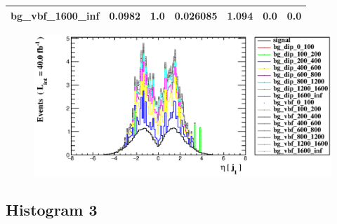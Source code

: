 \documentclass[a4paper, 10pt]{article}
\begin{document}
\begin{table}[H]
\begin{center}
\begin{tabular}{|m{23.0mm}|m{23.0mm}|m{18.0mm}|m{19.0mm}|m{19.0mm}|m{19.0mm}|m{19.0mm}|}
      \hline
      {\cellcolor{white}         bg\_vbf\_1600\_inf}& {\cellcolor{white}         0.0982}& {\cellcolor{white}         1.0}& {\cellcolor{white}         0.026085}& {\cellcolor{white}         1.094}& {\cellcolor{green}         0.0}& {\cellcolor{green}         0.0}\\
\hline
    \end{tabular}
  \end{center}
\end{table}

\begin{figure}[H]
  \begin{center}
    \includegraphics[scale=0.45]{selection_1.eps}\\
\caption{   }
  \end{center}
\end{figure}
      \newpage
\subsection{ Histogram 3}
\end{document}
